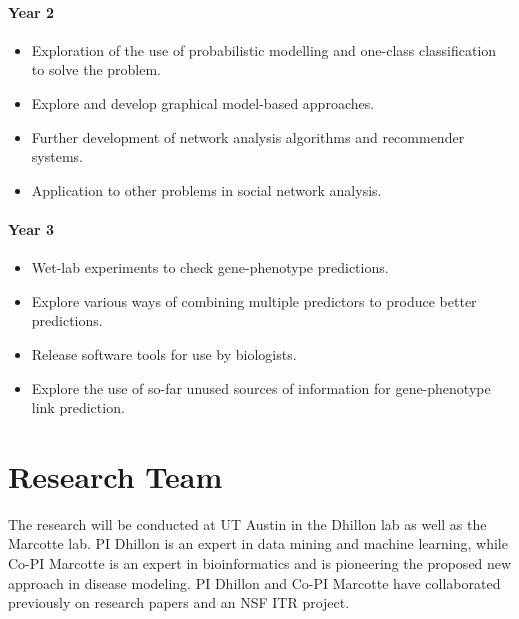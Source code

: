 \documentclass[11pt]{article}
\begin{document}
\vspace*{-3ex}
\paragraph*{Year 2}
\begin{itemize}
 \item Exploration of the use of probabilistic modelling and one-class classification to solve the problem.
 \item Explore and develop graphical model-based approaches.
 \item Further development of network analysis algorithms and recommender systems.
 \item Application to other problems in social network analysis.
\end{itemize}

\vspace*{-3ex}
\paragraph*{Year 3}
\begin{itemize}
 \item Wet-lab experiments to check gene-phenotype predictions.
 \item Explore various ways of combining multiple predictors to produce better predictions.
 \item Release software tools for use by biologists.
 \item Explore the use of so-far unused sources of information for gene-phenotype link prediction.
\end{itemize}

\section{Research Team}
The research will be conducted at UT Austin in the Dhillon lab as well as the Marcotte lab. PI Dhillon is an expert in data mining and machine learning, while Co-PI Marcotte is an expert in bioinformatics and is pioneering the proposed new approach in disease modeling\cite{newsMarcotteNY}. PI Dhillon and Co-PI Marcotte have collaborated previously on research papers \cite{isd:emm:ur:2002a} and an NSF ITR project.

\pagebreak


\end{document}
